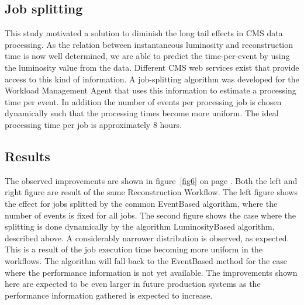 \documentclass[a4paper]{jpconf}
\begin{document}
\subsection{Job splitting}

This study motivated a solution to diminish the long tail effects in CMS data processing. As the relation between instantaneous luminosity and reconstruction time is now well determined, we are able to predict the time-per-event by using the luminosity value from the data. Different CMS web services exist that provide access to this kind of information.  A job-splitting algorithm was developed for the Workload Management Agent that uses this information to estimate a processing time per event. In addition the number of events per processing job is chosen dynamically such that the processing times become more uniform. The ideal processing time per job is approximately 8 hours.


\subsection{Results}

The observed improvements are shown in figure~\ref{fig6} on page \pageref{fig6}. Both the left and right figure are result of the same Reconstruction Workflow. The left figure shows the effect for jobs splitted by the common EventBased algorithm, where the number of events is fixed for all jobs. The second figure shows the case where the splitting is done dynamically by the algorithm LuminosityBased algorithm, described above. A considerably narrower distribution is observed, as expected. This is a result of the job execution time becoming more uniform in the workflows. The algorithm will fall back to the EventBased method for the case where the performance information is not yet available.  The improvements shown here are expected to be even larger in future production systems as the performance information gathered is expected to increase.
\end{document}
